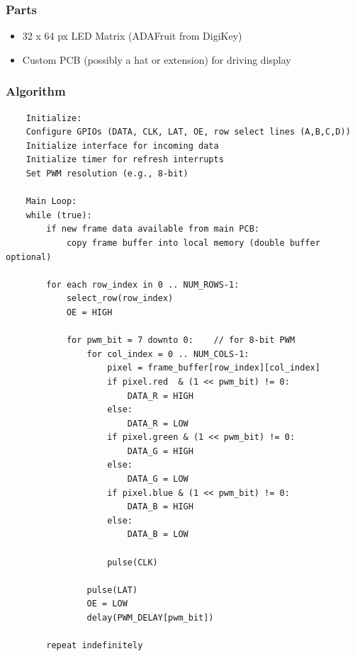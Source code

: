 \subsubsection{Parts}
\begin{itemize}
    \item 32 x 64 px LED Matrix (ADAFruit from DigiKey)
    \item Custom PCB (possibly a hat or extension) for driving display
\end{itemize}

\subsubsection{Algorithm}

\begin{lstlisting}
    Initialize:
    Configure GPIOs (DATA, CLK, LAT, OE, row select lines (A,B,C,D))
    Initialize interface for incoming data
    Initialize timer for refresh interrupts
    Set PWM resolution (e.g., 8-bit)

    Main Loop:
    while (true):
        if new frame data available from main PCB:
            copy frame buffer into local memory (double buffer optional)
        
        for each row_index in 0 .. NUM_ROWS-1:
            select_row(row_index)        
            OE = HIGH                   
            
            for pwm_bit = 7 downto 0:    // for 8-bit PWM
                for col_index = 0 .. NUM_COLS-1:
                    pixel = frame_buffer[row_index][col_index]
                    if pixel.red  & (1 << pwm_bit) != 0:
                        DATA_R = HIGH
                    else:
                        DATA_R = LOW
                    if pixel.green & (1 << pwm_bit) != 0:
                        DATA_G = HIGH
                    else:
                        DATA_G = LOW
                    if pixel.blue & (1 << pwm_bit) != 0:
                        DATA_B = HIGH
                    else:
                        DATA_B = LOW
                    
                    pulse(CLK)           
                    
                pulse(LAT)                
                OE = LOW                   
                delay(PWM_DELAY[pwm_bit])  
                
        repeat indefinitely
\end{lstlisting}

